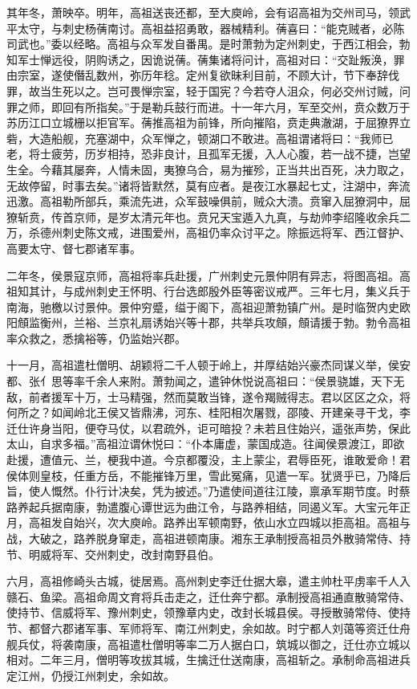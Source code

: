 \documentclass[]{article}
\begin{document}
其年冬，萧映卒。明年，高祖送丧还都，至大庾岭，会有诏高祖为交州司马，领武平太守，与刺史杨蒨南讨。高祖益招勇敢，器械精利。蒨喜曰：``能克贼者，必陈司武也。''委以经略。高祖与众军发自番禺。是时萧勃为定州刺史，于西江相会，勃知军士惮远役，阴购诱之，因诡说蒨。蒨集诸将问计，高祖对曰：``交趾叛涣，罪由宗室，遂使僭乱数州，弥历年稔。定州复欲昧利目前，不顾大计，节下奉辞伐罪，故当生死以之。岂可畏惮宗室，轻于国宪？今若夺人沮众，何必交州讨贼，问罪之师，即回有所指矣。''于是勒兵鼓行而进。十一年六月，军至交州，贲众数万于苏历江口立城栅以拒官军。蒨推高祖为前锋，所向摧陷，贲走典澈湖，于屈獠界立砦，大造船舰，充塞湖中，众军惮之，顿湖口不敢进。高祖谓诸将曰：``我师已老，将士疲劳，历岁相持，恐非良计，且孤军无援，入人心腹，若一战不捷，岂望生全。今藉其屡奔，人情未固，夷獠乌合，易为摧殄，正当共出百死，决力取之，无故停留，时事去矣。''诸将皆默然，莫有应者。是夜江水暴起七丈，注湖中，奔流迅激。高祖勒所部兵，乘流先进，众军鼓噪俱前，贼众大溃。贲窜入屈獠洞中，屈獠斩贲，传首京师，是岁太清元年也。贲兄天宝遁入九真，与劫帅李绍隆收余兵二万，杀德州刺史陈文戒，进围爱州，高祖仍率众讨平之。除振远将军、西江督护、高要太守、督七郡诸军事。

二年冬，侯景寇京师，高祖将率兵赴援，广州刺史元景仲阴有异志，将图高祖。高祖知其计，与成州刺史王怀明、行台选郎殷外臣等密议戒严。三年七月，集义兵于南海，驰檄以讨景仲。景仲穷蹙，缢于阁下，高祖迎萧勃镇广州。是时临贺内史欧阳頠监衡州，兰裕、兰京礼扇诱始兴等十郡，共举兵攻頠，頠请援于勃。勃令高祖率众救之，悉擒裕等，仍监始兴郡。

十一月，高祖遣杜僧明、胡颖将二千人顿于岭上，并厚结始兴豪杰同谋义举，侯安都、张亻思等率千余人来附。萧勃闻之，遣钟休悦说高祖曰：``侯景骁雄，天下无敌，前者援军十万，士马精强，然而莫敢当锋，遂令羯贼得志。君以区区之众，将何所之？如闻岭北王侯又皆鼎沸，河东、桂阳相次屠戮，邵陵、开建亲寻干戈，李迁仕许身当阳，便夺马仗，以君疏外，讵可暗投？未若且住始兴，遥张声势，保此太山，自求多福。''高祖泣谓休悦曰：``仆本庸虚，蒙国成造。往闻侯景渡江，即欲赴援，遭值元、兰，梗我中道。今京都覆没，主上蒙尘，君辱臣死，谁敢爱命！君侯体则皇枝，任重方岳，不能摧锋万里，雪此冤痛，见遣一军。犹贤乎已，乃降后旨，使人慨然。仆行计决矣，凭为披述。''乃遣使间道往江陵，禀承军期节度。时蔡路养起兵据南康，勃遣腹心谭世远为曲江令，与路养相结，同遏义军。大宝元年正月，高祖发自始兴，次大庾岭。路养出军顿南野，依山水立四城以拒高祖。高祖与战，大破之，路养脱身窜走，高祖进顿南康。湘东王承制授高祖员外散骑常侍、持节、明威将军、交州刺史，改封南野县伯。

六月，高祖修崎头古城，徙居焉。高州刺史李迁仕据大皋，遣主帅杜平虏率千人入赣石、鱼梁。高祖命周文育将兵击走之，迁仕奔宁都。承制授高祖通直散骑常侍、使持节、信威将军、豫州刺史，领豫章内史，改封长城县侯。寻授散骑常侍、使持节、都督六郡诸军事、军师将军、南江州刺史，余如故。时宁都人刘蔼等资迁仕舟舰兵仗，将袭南康，高祖遣杜僧明等率二万人据白口，筑城以御之，迁仕亦立城以相对。二年三月，僧明等攻拔其城，生擒迁仕送南康，高祖斩之。承制命高祖进兵定江州，仍授江州刺史，余如故。
\end{document}
